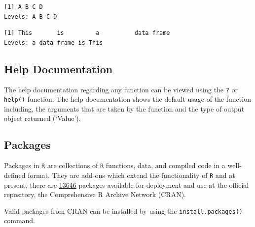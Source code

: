 \begin{verbatim}
[1] A B C D
Levels: A B C D
\end{verbatim}

\begin{Shaded}
\begin{Highlighting}[]
\OperatorTok{$}
\end{Highlighting}
\end{Shaded}

\begin{verbatim}
[1] This       is         a          data frame
Levels: a data frame is This
\end{verbatim}

\hypertarget{help-documentation}{%
\subsection{Help Documentation}\label{help-documentation}}

The help documentation regarding any function can be viewed using the
\texttt{?} or \texttt{help()} function. The help documentation shows the
default usage of the function including, the arguments that are taken by
the function and the type of output object returned (`Value').

\begin{Shaded}
\begin{Highlighting}[]


\end{Highlighting}
\end{Shaded}

\hypertarget{pack}{%
\subsection{Packages}\label{pack}}

Packages in \texttt{R} are collections of \texttt{R} functions, data,
and compiled code in a well-defined format. They are add-ons which
extend the functionality of \texttt{R} and at present, there are
\href{https://cran.r-project.org/web/packages/available_packages_by_name.html}{13646}
packages available for deployment and use at the official repository,
the Comprehensive R Archive Network (CRAN).

Valid packages from CRAN can be installed by using the
\texttt{install.packages()} command.

